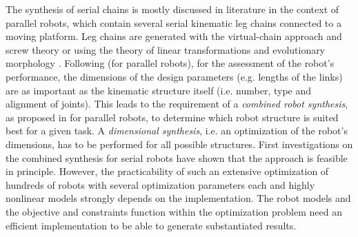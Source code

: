 \documentclass[runningheads]{llncs}
\begin{document}
The synthesis of serial chains is mostly discussed in literature in the context of parallel robots, which contain several serial kinematic leg chains connected to a moving platform.
Leg chains are generated with the virtual-chain approach and screw theory \cite{KongGos2007} or using the theory of linear transformations and evolutionary morphology \cite{Gogu2008}.
Following \cite[p.25]{Merlet2006} (for parallel robots), for the assessment of the robot's performance, the dimensions of the design parameters (e.g. lengths of the links) are as important as the kinematic structure itself (i.e. number, type and alignment of joints).
This leads to the requirement of a \emph{combined robot synthesis}, as proposed in \cite{Krefft2006} for parallel robots, to determine which robot structure is suited best for a given task.
A \emph{dimensional synthesis}, i.e. an optimization of the robot's dimensions, has to be performed for all possible structures.
First investigations on the combined synthesis for serial robots \cite{Ramirez2018} have shown that the approach is feasible in principle.
However, the practicability of such an extensive optimization of hundreds of robots with several optimization parameters each and highly nonlinear models strongly depends on the implementation.
The robot models and the objective and constraints function within the optimization problem need an efficient implementation to be able to generate substantiated results.

\end{document}
